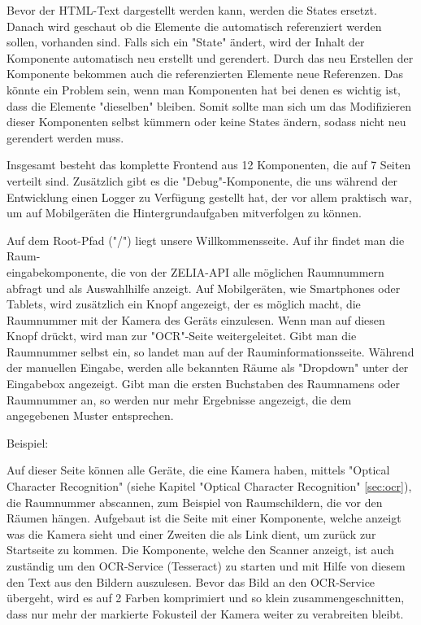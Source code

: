 Bevor der HTML-Text dargestellt werden kann, werden die States ersetzt. Danach wird geschaut ob die Elemente die automatisch referenziert werden sollen, vorhanden sind. Falls sich ein "State" ändert, wird der Inhalt der Komponente automatisch neu erstellt und gerendert. Durch das neu Erstellen der Komponente bekommen auch die referenzierten Elemente neue Referenzen. Das könnte ein Problem sein, wenn man Komponenten hat bei denen es wichtig ist, dass die Elemente "dieselben" bleiben. Somit sollte man sich um das Modifizieren dieser Komponenten selbst kümmern oder keine States ändern, sodass nicht neu gerendert werden muss.


Insgesamt besteht das komplette Frontend aus 12 Komponenten, die auf 7 Seiten verteilt sind. Zusätzlich gibt es die "Debug"-Komponente, die uns während der Entwicklung einen Logger zu Verfügung gestellt hat, der vor allem praktisch war, um auf Mobilgeräten die Hintergrundaufgaben mitverfolgen zu können.


Auf dem Root-Pfad ("/") liegt unsere Willkommensseite. Auf ihr findet man die Raum-\\eingabekomponente, die von der ZELIA-API alle möglichen Raumnummern abfragt und als Auswahlhilfe anzeigt. Auf Mobilgeräten, wie Smartphones oder Tablets, wird zusätzlich ein Knopf angezeigt, der es möglich macht, die Raumnummer mit der Kamera des Geräts einzulesen. Wenn man auf diesen Knopf drückt, wird man zur "OCR"-Seite weitergeleitet. Gibt man die Raumnummer selbst ein, so landet man auf der Rauminformationsseite. Während der manuellen Eingabe, werden alle bekannten Räume als "Dropdown" unter der Eingabebox angezeigt. Gibt man die ersten Buchstaben des Raumnamens oder Raumnummer an, so werden nur mehr Ergebnisse angezeigt, die dem angegebenen Muster entsprechen.

Beispiel:



Auf dieser Seite können alle Geräte, die eine Kamera haben, mittels "Optical Character Recognition" (siehe Kapitel "Optical Character Recognition" \ref{sec:ocr}), die Raumnummer abscannen, zum Beispiel von Raumschildern, die vor den Räumen hängen. Aufgebaut ist die Seite mit einer Komponente, welche anzeigt was die Kamera sieht und einer Zweiten die als Link dient, um zurück zur Startseite zu kommen. Die Komponente, welche den Scanner anzeigt, ist auch zuständig um den OCR-Service (Tesseract) zu starten und mit Hilfe von diesem den Text aus den Bildern auszulesen. Bevor das Bild an den OCR-Service übergeht, wird es auf 2 Farben komprimiert und so klein zusammengeschnitten, dass nur mehr der markierte Fokusteil der Kamera weiter zu verabreiten bleibt.

